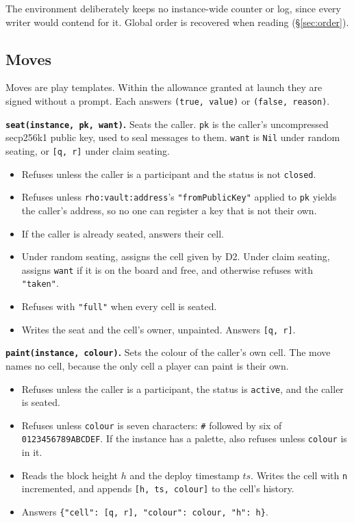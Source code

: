 \documentclass[11pt,a4paper]{article}
\newcommand{\code}[1]{\texttt{#1}}
\begin{document}
The environment deliberately keeps no instance-wide counter or log, since every writer would
contend for it. Global order is recovered when reading (\S\ref{sec:order}).

\subsection{Moves}

Moves are play templates. Within the allowance granted at launch they are signed without a
prompt. Each answers \code{(true, value)} or \code{(false, reason)}.

\textbf{\code{seat(instance, pk, want)}.} Seats the caller. \code{pk} is the caller's
uncompressed secp256k1 public key, used to seal messages to them. \code{want} is \code{Nil}
under random seating, or \code{[q, r]} under claim seating.
\begin{itemize}[leftmargin=1.2em,itemsep=1pt]
\item Refuses unless the caller is a participant and the status is not \code{closed}.
\item Refuses unless \code{rho:vault:address}'s \code{"fromPublicKey"} applied to \code{pk}
  yields the caller's address, so no one can register a key that is not their own.
\item If the caller is already seated, answers their cell.
\item Under random seating, assigns the cell given by D2. Under claim seating, assigns
  \code{want} if it is on the board and free, and otherwise refuses with \code{"taken"}.
\item Refuses with \code{"full"} when every cell is seated.
\item Writes the seat and the cell's owner, unpainted. Answers \code{[q, r]}.
\end{itemize}

\textbf{\code{paint(instance, colour)}.} Sets the colour of the caller's own cell. The move
names no cell, because the only cell a player can paint is their own.
\begin{itemize}[leftmargin=1.2em,itemsep=1pt]
\item Refuses unless the caller is a participant, the status is \code{active}, and the caller
  is seated.
\item Refuses unless \code{colour} is seven characters: \code{\#} followed by six of
  \code{0123456789ABCDEF}. If the instance has a palette, also refuses unless \code{colour} is
  in it.
\item Reads the block height $h$ and the deploy timestamp $ts$. Writes the cell with
  \code{n} incremented, and appends \code{[h, ts, colour]} to the cell's history.
\item Answers \code{\{"cell": [q, r], "colour": colour, "h": h\}}.
\end{itemize}
\end{document}
